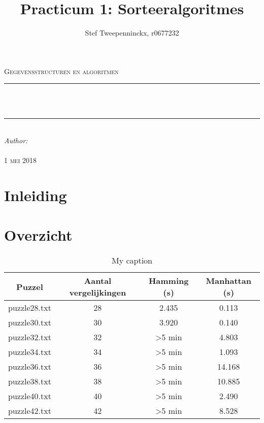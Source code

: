 \documentclass[11pt, a4paper]{article}
\author{Stef Tweepenninckx, r0677232}
\title{Practicum 1: Sorteeralgoritmes}
\makeatletter
\def\printtitle{                 
    {\large \@title}}
\def\printauthor{                  
    {\large \@author}}
\makeatother
\begin{document}
\begin{titlepage}
\newcommand{\HRule}{\rule{\linewidth}{0.5mm}} 
\center 
\textsc{\LARGE Gegevensstructuren en algoritmen}\\[1.5cm] 
\HRule \\[0.4cm]

{\huge \bfseries \printtitle}\\[0.4cm] 
\HRule \\[0.4cm]

\Large \emph{Author:}\\
 \textsc{\printauthor}\\[3cm]

{\large \textsc{1 mei 2018}}\\[3cm] 

\vfill 
\end{titlepage}

\section*{Inleiding}

\section*{Overzicht}
\begin{table}[ht]
\centering
\label{my-label}
\begin{tabular}{|cccc|}
\hline
Puzzel       & Aantal vergelijkingen & Hamming (s)        & Manhattan (s) \\ \hline
puzzle28.txt & 28                    & 2.435              & 0.113         \\
puzzle30.txt & 30                    & 3.920              & 0.140         \\
puzzle32.txt & 32                    & \textgreater 5 min & 4.803         \\
puzzle34.txt & 34                    & \textgreater 5 min & 1.093         \\
puzzle36.txt & 36                    & \textgreater 5 min & 14.168        \\
puzzle38.txt & 38                    & \textgreater 5 min & 10.885        \\
puzzle40.txt & 40                    & \textgreater 5 min & 2.490         \\
puzzle42.txt & 42                    & \textgreater 5 min & 8.528         \\ \hline
\end{tabular}
\caption{My caption}
\end{table}
\end{document}
